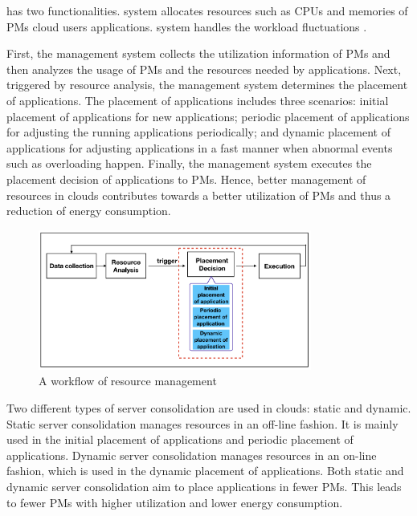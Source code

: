 has two  functionalities.  system 
allocates resources such as CPUs and memories of PMs  cloud users  applications.  system 
handles the workload fluctuations .  

First, the management system collects the utilization information of PMs and then 
analyzes the usage of PMs and the resources needed by applications. Next, triggered by resource analysis, the management system determines the 
placement of applications. The placement of applications includes three scenarios: initial placement of applications for new applications; periodic placement of applications for adjusting the running applications periodically; 
and dynamic placement of applications for adjusting applications in a fast manner when abnormal events such as overloading happen. Finally, 
the management system executes the placement decision of applications to PMs. Hence, better management of resources 
in clouds contributes towards a better utilization of PMs and thus a reduction of energy consumption.



\begin{figure}
	\centering
	\includegraphics[width=0.8\textwidth]{pics/workflow_management.png}
	\caption{A workflow of resource management \cite{Mishra:2012kx}}
	\label{fig:workflow}
\end{figure}



 Two different types of
server consolidation are used in clouds: static and dynamic. Static server consolidation manages resources in an off-line fashion. It is mainly 
used in the initial placement of applications and periodic placement of applications. Dynamic server consolidation manages resources in 
an on-line fashion, which is used in the dynamic placement of applications. Both static and dynamic server consolidation aim to place
applications in fewer PMs. This leads to fewer PMs with higher utilization and lower energy consumption.



